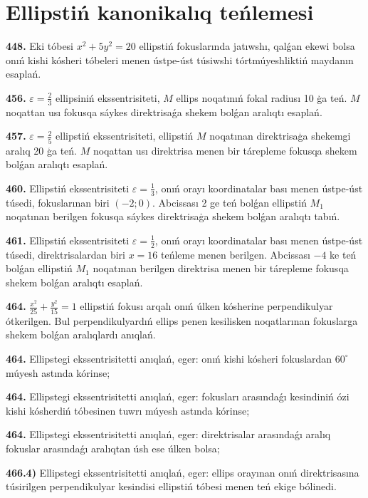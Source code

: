 \section{Ellipstiń kanonikalıq teńlemesi}



\textbf{448.} Eki tóbesi $x^2+5 y^2=20$ ellipstiń fokuslarında jatıwshı, qalǵan ekewi bolsa onıń kishi kósheri tóbeleri menen ústpe-úst túsiwshi tórtmúyeshliktiń maydanın esaplań.


\textbf{456.} $\varepsilon=\frac{2}{3}$ ellipsiniń ekssentrisiteti, $M$ ellips noqatınıń fokal radiusı 10 ģa teń. $M$ noqattan usı fokusqa sáykes direktrisaǵa shekem bolǵan aralıqtı esaplań.


\textbf{457.} $\varepsilon=\frac{2}{5}$ ellipstiń ekssentrisiteti, ellipstiń $M$ noqatınan direktrisaģa shekemgi aralıq 20 ģa teń. $M$ noqattan usı direktrisa menen bir tárepleme fokusqa shekem bolǵan aralıqtı esaplań.

\textbf{460.} Ellipstiń ekssentrisiteti $\varepsilon=\frac{1}{3}$, onıń orayı koordinatalar bası menen ústpe-úst túsedi, fokuslarınan biri $ (-2; 0) $. Abcissası 2 ge teń bolǵan ellipstiń $M_1$ noqatınan berilgen fokusqa sáykes direktrisaģa shekem bolǵan aralıqtı tabıń.

\textbf{461.} Ellipstiń ekssentrisiteti $\varepsilon=\frac{1}{2}$, onıń orayı koordinatalar bası menen ústpe-úst túsedi, direktrisalardan biri $x=16$ teńleme menen berilgen. Abcissası $-4$ ke teń bolǵan ellipstiń $M_1$ noqatınan berilgen direktrisa menen bir tárepleme fokusqa shekem bolǵan aralıqtı esaplań.

\textbf{464.} $\frac{x^2}{25}+\frac{y^2}{15}=1$ ellipstiń fokusı arqalı onıń úlken kósherine perpendikulyar ótkerilgen. Bul perpendikulyardıń ellips penen kesilisken noqatlarınan fokuslarga shekem bolǵan aralıqlardı anıqlań.

\textbf{464.} Ellipstegi ekssentrisitetti anıqlań, eger: onıń kishi kósheri fokuslardan $60^{\circ}$ múyesh astında kórinse;

\textbf{464.} Ellipstegi ekssentrisitetti anıqlań, eger: fokusları arasındaǵı kesindiniń ózi kishi kósherdiń tóbesinen tuwrı múyesh astında kórinse;

\textbf{464.} Ellipstegi ekssentrisitetti anıqlań, eger: direktrisalar arasındaǵı aralıq fokuslar arasındaǵı aralıqtan úsh ese úlken bolsa;

\textbf{466.4)} Ellipstegi ekssentrisitetti anıqlań, eger: ellips orayınan onıń direktrisasına túsirilgen perpendikulyar kesindisi ellipstiń tóbesi menen teń ekige bólinedi.

